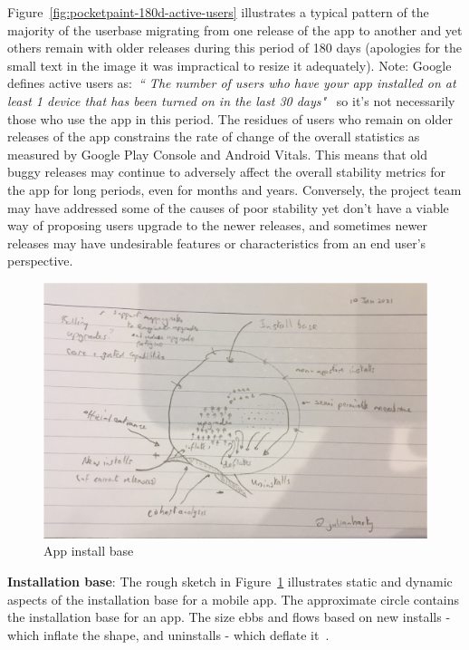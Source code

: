 Figure~\ref{fig:pocketpaint-180d-active-users} illustrates a typical pattern of the majority of the userbase migrating from one release of the  app to another and yet others remain with older releases during this period of 180 days (apologies for the small text in the image it was impractical to resize it adequately). Note: Google defines active users as:~\emph{``
The number of users who have your app installed on at least 1 device that has been turned on in the last 30 days"}~ so it's not necessarily those who use the app in this period. The residues of users who remain on older releases of the app constrains the rate of change of the overall statistics as measured by Google Play Console and Android Vitals. This means that old buggy releases may continue to adversely affect the overall stability metrics for the app for long periods, even for months and years. Conversely, the project team may have addressed some of the causes of poor stability yet don't have a viable way of proposing users upgrade to the newer releases, and sometimes newer releases may have undesirable features or characteristics from an end user's perspective.

\begin{figure}
    \includegraphics[width=\linewidth]{images/rough-sketches/app-install-base.pdf}
    \caption{App install base}
    \label{fig:app-install-base-rough}
\end{figure}

\textbf{Installation base}: The rough sketch in Figure~\ref{fig:app-install-base-rough} illustrates static and dynamic aspects of the installation base for a mobile app. The approximate circle contains the installation base for an app. The size ebbs and flows based on new installs - which inflate the shape, and uninstalls - which deflate it~. 

